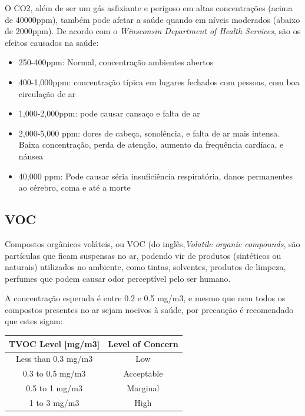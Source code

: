 \documentclass[]{politex}
\begin{document}
O CO2, além de ser um gás asfixiante e perigoso em altas concentrações (acima de 40000ppm), também pode afetar a saúde quando em níveis moderados (abaixo de 2000ppm). 
De acordo com o \textit{Winsconsin Department of Health Services}\cite{Winsconsin}, são os efeitos causados na saúde: 
\begin{itemize}
\item 250-400ppm: Normal, concentração ambientes abertos
\item 400-1,000ppm: concentração típica em lugares fechados com pessoas, com boa circulação de ar
\item 1,000-2,000ppm: pode causar cansaço e falta de ar
\item 2,000-5,000 ppm: dores de cabeça, sonolência, e falta de ar mais intensa. Baixa concentração, perda de atenção, aumento da frequência cardíaca, e náusea
\item 40,000 ppm: Pode causar séria insuficiência respiratória, danos permanentes ao cérebro, coma e até a morte
\end{itemize}

\subsection{VOC}
Compostos orgânicos voláteis, ou VOC (do inglês,\textit{Volatile organic compounds}, são partículas que ficam suspensas no ar, podendo vir de produtos (sintéticos ou naturais) utilizados no ambiente, como tintas, solventes, produtos de limpeza, perfumes que podem causar odor perceptível pelo ser humano\cite{AirQuality}.

A concentração esperada é entre 0.2 e 0.5 mg/m3, e mesmo que nem todos os compostos presentes no ar sejam nocivos à saúde, por precaução é recomendado que estes sigam: \cite{tecam}

\begin{tabular}{ |c|c| }
\hline
TVOC Level [mg/m3]	&   Level of Concern \\
\hline
Less than 0.3 mg/m3	 &  Low \\
0.3 to 0.5 mg/m3	&   Acceptable \\
0.5 to 1 mg/m3	 &  Marginal \\
1 to 3 mg/m3	 &  High \\
\hline
\end{tabular}

\end{document}
